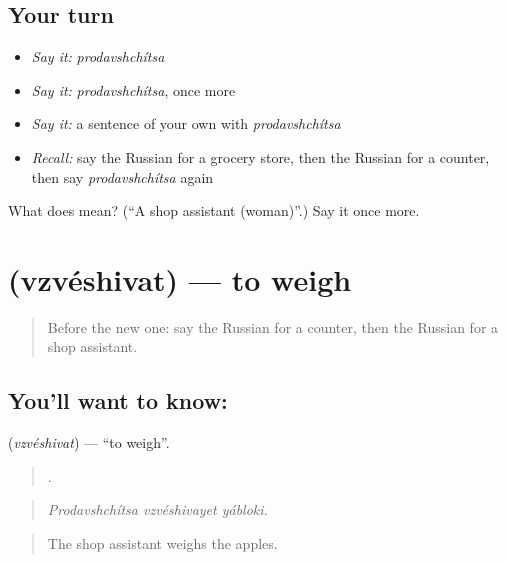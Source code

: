 \subsection*{Your turn}
\begin{itemize}
\raggedright
  \item \emph{Say it:} \emph{prodavshchítsa}
  \item \emph{Say it:} \emph{prodavshchítsa}, once more
  \item \emph{Say it:} a sentence of your own with \emph{prodavshchítsa}
  \item \emph{Recall:} say the Russian for a grocery store, then the Russian for a counter, then say \emph{prodavshchítsa} again
\end{itemize}

\begin{tcolorbox}[breakable,colback=teal!4,colframe=teal!35!black,title={Before you move on}]
What does  mean? (\textquotedblleft{}A shop assistant (woman)\textquotedblright{}.) Say it once more.
\end{tcolorbox}
\section[\texorpdfstring{\ru{взвешивать} (vzvéshivat)}{взвешивать (vzvéshivat)}]{ (vzvéshivat) — to weigh}

\label{lesson:RU-C452-vzveshivat}



\begin{quote}
Before the new one: say the Russian for a counter, then the Russian for a shop assistant.
\end{quote}

\subsection*{You'll want to know: }
\textbf{} (\emph{vzvéshivat}) — \textquotedblleft{}to weigh\textquotedblright{}.

\begin{quote}
  .
\end{quote}

\begin{quote}
\emph{Prodavshchítsa vzvéshivayet yábloki.}
\end{quote}

\begin{quote}
The shop assistant weighs the apples.
\end{quote}

